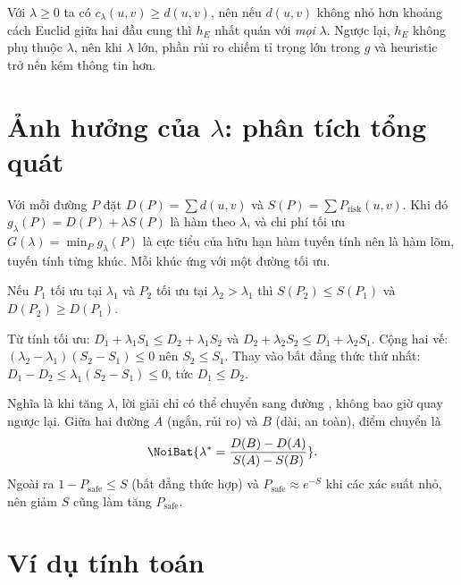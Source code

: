 Với $\lambda \ge 0$ ta có $c_\lambda(u, v) \ge d(u, v)$, nên nếu $d(u, v)$ không nhỏ hơn khoảng
cách Euclid giữa hai đầu cung thì $h_E$ nhất quán với \emph{mọi} $\lambda$. Ngược lại, $h_E$ không
phụ thuộc $\lambda$, nên khi $\lambda$ lớn, phần rủi ro chiếm tỉ trọng lớn trong $g$ và heuristic
trở nên kém thông tin hơn.

\section{Ảnh hưởng của $\lambda$: phân tích tổng quát}
\label{sec:t3-ly-thuyet}

Với mỗi đường $P$ đặt $D(P) = \sum d(u, v)$ và $S(P) = \sum P_{\text{risk}}(u, v)$. Khi đó
$g_\lambda(P) = D(P) + \lambda S(P)$ là hàm  theo $\lambda$, và chi phí tối ưu
$G(\lambda) = \min_P g_\lambda(P)$ là cực tiểu của hữu hạn hàm tuyến tính nên là hàm lõm, tuyến
tính từng khúc. Mỗi khúc ứng với một đường tối ưu.

\begin{dinhly}
  \label{dl:t3-don-dieu}
  Nếu $P_1$ tối ưu tại $\lambda_1$ và $P_2$ tối ưu tại $\lambda_2 > \lambda_1$ thì
  $S(P_2) \le S(P_1)$ và $D(P_2) \ge D(P_1)$.
\end{dinhly}

\begin{loigiai}
  Từ tính tối ưu: $D_1 + \lambda_1 S_1 \le D_2 + \lambda_1 S_2$ và
  $D_2 + \lambda_2 S_2 \le D_1 + \lambda_2 S_1$. Cộng hai vế:
  $(\lambda_2 - \lambda_1)(S_2 - S_1) \le 0$ nên $S_2 \le S_1$. Thay vào bất đẳng thức thứ nhất:
  $D_1 - D_2 \le \lambda_1 (S_2 - S_1) \le 0$, tức $D_1 \le D_2$.
\end{loigiai}

Nghĩa là khi tăng $\lambda$, lời giải chỉ có thể chuyển sang đường , không bao giờ quay ngược lại. Giữa hai đường $A$ (ngắn, rủi ro) và $B$ (dài, an toàn),
điểm chuyển là
\begin{equation}
  \NoiBat{\lambda^\ast = \frac{D(B) - D(A)}{S(A) - S(B)}}.
  \label{eq:t3-nguong}
\end{equation}
Ngoài ra $1 - P_{\text{safe}} \le S$ (bất đẳng thức hợp) và $P_{\text{safe}} \approx e^{-S}$ khi
các xác suất nhỏ, nên giảm $S$ cũng làm tăng $P_{\text{safe}}$.

\section{Ví dụ tính toán}
\label{sec:t3-vi-du}

